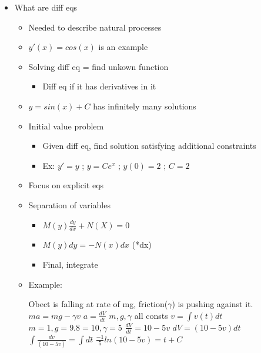 \begin{itemize}

  \item What are diff eqs
  \begin{itemize}
    \item Needed to describe natural processes\
    \item $y'(x) = cos(x)$ is an example
    \item Solving diff eq = find unkown function
    \begin{itemize}
      \item Diff eq if it has derivatives in it
    \end{itemize}
    \item $y = sin(x) + C$ has infinitely many solutions
    \item Initial value problem
    \begin{itemize}
      \item Given diff eq, find solution satisfying additional constraints
      \item Ex: $y' = y$ ; $y=Ce^x$ ; $y(0) = 2$ ; $C=2$
    \end{itemize}
    \item Focus on explicit eqs
    \item Separation of variables
    \begin{itemize}
      \item $M(y)\frac{dy}{dx} +N(X) = 0$
      \item $M(y)dy = -N(x)dx$ (*dx)
      \item Final, integrate
    \end{itemize}
    \item Example:\newline
    \begin{minipage}{2in}
      Obect is falling at rate of mg, friction($\gamma$) is pushing against it.\newline
      $ma = mg - \gamma v$\newline
      $a = \frac{dV}{dt}$\newline
      $m,g,\gamma$ all consts\newline
      $v = \int v(t)dt$\newline
      $m=1, g=9.8=10, \gamma = 5$\newline
      $\frac{dV}{dt} = 10-5v$\newline
      $dV=(10-5v)dt$ \newline
      $\int \frac{dv}{(10-5v)} = \int dt$\=\newline
      $\frac{-1}{5} ln(10-5v) = t + C$\newline

\end{minipage}
\end{itemize}
\end{itemize}
